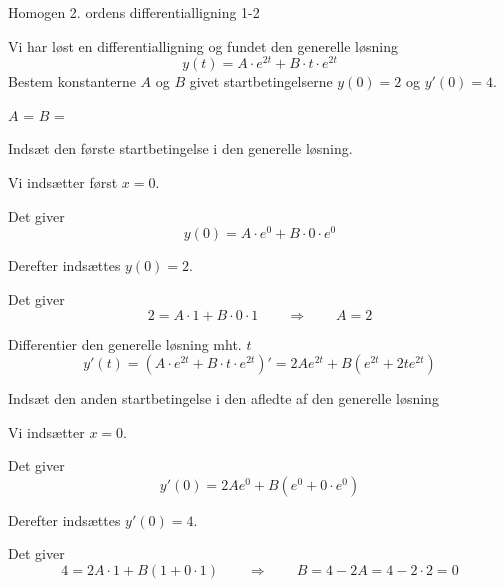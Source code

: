 \documentclass{article}
\begin{document}
\newpage

\begin{exercise}{Homogen 2. ordens differentialligning 1-2}

Vi har løst en differentialligning og fundet den generelle løsning
\[
y(t) = A \cdot e^{2t} + B \cdot t \cdot e^{2t}
\]
Bestem konstanterne $A$ og $B$ givet startbetingelserne $y(0)=2$ og $y'(0)=4$.


$A$ = 
$B$ = 

\hint

Indsæt den første startbetingelse i den generelle løsning.


\hint

Vi indsætter først $x=0$.

\hint

Det giver
\[
y(0)= A \cdot e^{0} + B \cdot 0 \cdot e^{0}
\]

\hint

Derefter indsættes $y(0)=2$.

\hint

Det giver
\[
2 = A \cdot 1 + B \cdot 0 \cdot 1 \qquad \Rightarrow \qquad A = 2
\]

\hint

Differentier den generelle løsning mht. $t$
\[
y'(t)= \left(A \cdot e^{2t} + B \cdot t \cdot e^{2t} \right)' = 2A e^{2t} + B \left( e^{2t} +2 t e^{2t} \right)
\]

\hint

Indsæt den anden startbetingelse i den afledte af den generelle løsning

\hint

Vi indsætter $x=0$.

\hint

Det giver
\[
y'(0) = 2A e^{0} + B \left( e^{0} + 0 \cdot e^{0} \right)
\]

\hint

Derefter indsættes $y'(0)=4$.

\hint

Det giver
\[
4 = 2A \cdot 1 + B \left(1 + 0 \cdot 1 \right) \qquad \Rightarrow \qquad B = 4 - 2A = 4 - 2 \cdot 2 = 0
\]


\end{exercise}

\newpage
\end{document}
